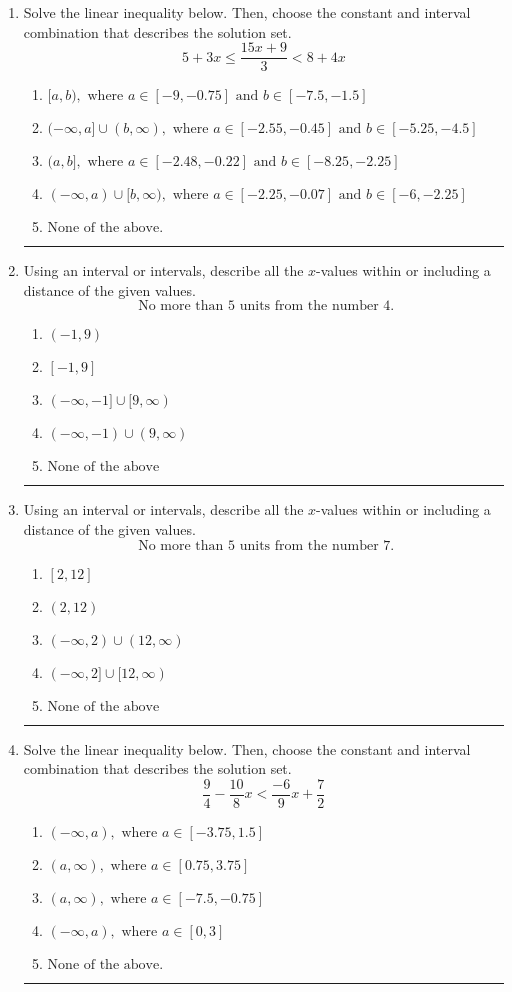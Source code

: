 \documentclass[14pt]{extbook}
\newcommand{\litem}[1]{\item#1\hspace*{-1cm}\rule{\textwidth}{0.4pt}}
\begin{document}
\begin{enumerate}
\litem{
Solve the linear inequality below. Then, choose the constant and interval combination that describes the solution set.\[ 5 + 3 x \leq \frac{15 x + 9}{3} < 8 + 4 x \]\begin{enumerate}[label=\Alph*.]
\item \( [a, b), \text{ where } a \in [-9, -0.75] \text{ and } b \in [-7.5, -1.5] \)
\item \( (-\infty, a] \cup (b, \infty), \text{ where } a \in [-2.55, -0.45] \text{ and } b \in [-5.25, -4.5] \)
\item \( (a, b], \text{ where } a \in [-2.48, -0.22] \text{ and } b \in [-8.25, -2.25] \)
\item \( (-\infty, a) \cup [b, \infty), \text{ where } a \in [-2.25, -0.07] \text{ and } b \in [-6, -2.25] \)
\item \( \text{None of the above.} \)

\end{enumerate} }
\litem{
Using an interval or intervals, describe all the $x$-values within or including a distance of the given values.\[ \text{ No more than } 5 \text{ units from the number } 4. \]\begin{enumerate}[label=\Alph*.]
\item \( (-1, 9) \)
\item \( [-1, 9] \)
\item \( (-\infty, -1] \cup [9, \infty) \)
\item \( (-\infty, -1) \cup (9, \infty) \)
\item \( \text{None of the above} \)

\end{enumerate} }
\litem{
Using an interval or intervals, describe all the $x$-values within or including a distance of the given values.\[ \text{ No more than } 5 \text{ units from the number } 7. \]\begin{enumerate}[label=\Alph*.]
\item \( [2, 12] \)
\item \( (2, 12) \)
\item \( (-\infty, 2) \cup (12, \infty) \)
\item \( (-\infty, 2] \cup [12, \infty) \)
\item \( \text{None of the above} \)

\end{enumerate} }
\litem{
Solve the linear inequality below. Then, choose the constant and interval combination that describes the solution set.\[ \frac{9}{4} - \frac{10}{8} x < \frac{-6}{9} x + \frac{7}{2} \]\begin{enumerate}[label=\Alph*.]
\item \( (-\infty, a), \text{ where } a \in [-3.75, 1.5] \)
\item \( (a, \infty), \text{ where } a \in [0.75, 3.75] \)
\item \( (a, \infty), \text{ where } a \in [-7.5, -0.75] \)
\item \( (-\infty, a), \text{ where } a \in [0, 3] \)
\item \( \text{None of the above}. \)


\end{enumerate}}
\end{enumerate}
\end{document}
